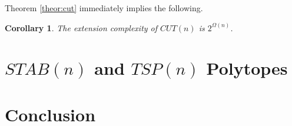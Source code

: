 \documentclass{article}
\newtheorem{corollary}[theorem]{\sc Corollary}
\theoremstyle{definition}
\theoremstyle{remark}
\begin{document}
Theorem \ref{theor:cut} immediately implies the following.

\begin{corollary}\label{cor:cut}
The extension complexity of $CUT(n)$ is $2^{\Omega(n)}$.
\end{corollary}

\section{$STAB(n)$ and $TSP(n)$ Polytopes}


\section{Conclusion}



\end{document}
